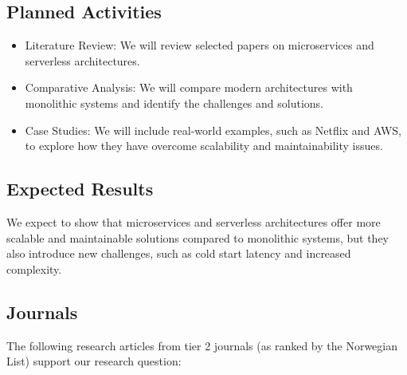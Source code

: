 \documentclass[a4paper, 12pt]{article}
\begin{document}
\subsection{Planned Activities}
\begin{itemize}
    \item Literature Review: We will review selected papers on microservices and serverless architectures.
    \item Comparative Analysis: We will compare modern architectures with monolithic systems and identify the challenges and solutions.
    \item Case Studies: We will include real-world examples, such as Netflix and AWS, to explore how they have overcome scalability and maintainability issues.
\end{itemize}

\subsection{Expected Results}
We expect to show that microservices and serverless architectures offer more scalable and maintainable solutions compared to monolithic systems, but they also introduce new challenges, such as cold start latency and increased complexity.

\subsection{Journals}
The following research articles from tier 2 journals (as ranked by the Norwegian List) support our research question:
\end{document}
